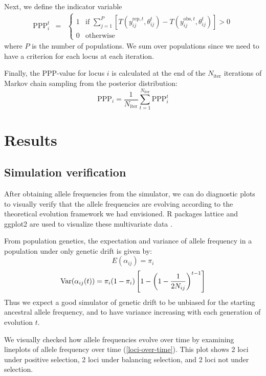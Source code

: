 \documentclass[a4paper,12pt]{article}
\begin{document}
Next, we define the indicator variable
\begin{eqnarray*}
\text{PPP}_i^t &=&
\begin{cases}
  1 & \text{if }\sum_{j=1}^P\left[ T(y_{ij}^{\text{rep},t},\theta_{ij}^t) 
                          - T(y_{ij}^{\text{obs},t},\theta_{ij}^t)\right] > 0\\
  0 & \text{otherwise}
\end{cases}
\end{eqnarray*}
where $P$ is the number of populations. We sum over populations since
we need to have a criterion for each locus at each iteration.

Finally, the PPP-value for locus $i$ is calculated at the end of the
$N_{\text{iter}}$ iterations of Markov chain sampling from the
posterior distribution:
$$
\text{PPP}_i = \frac 1 {N_{\text{iter}}} 
\sum_{t=1}^{N_{\text{iter}}} \text{PPP}_{i}^t
$$

\section{Results}

\subsection{Simulation verification}

After obtaining allele frequencies from the simulator, we can do
diagnostic plots to visually verify that the allele frequencies are
evolving according to the theoretical evolution framework we had
envisioned. R packages lattice and ggplot2 are used to visualize these
multivariate data \cite{lattice,ggplot2}.

From population genetics, the expectation and variance of allele
frequency in a population under only genetic drift is given by:
$$E({\alpha_{ij}})=\pi_i$$
$$\operatorname{Var}(\alpha_{ij}(t))=\pi_i(1-\pi_i)
\left[1-\left(1-\frac{1}{2N_{ij}}\right)^{t-1}\right]$$
Thus we expect a good simulator of genetic drift to be unbiased for
the starting ancestral allele frequency, and to have variance
increasing with each generation of evolution $t$.

We visually checked how allele frequencies evolve over time by
examining lineplots of allele frequency over time
(\autoref{loci-over-time}). This plot shows 2 loci under positive
selection, 2 loci under balancing selection, and 2 loci not under
selection.

\end{document}
